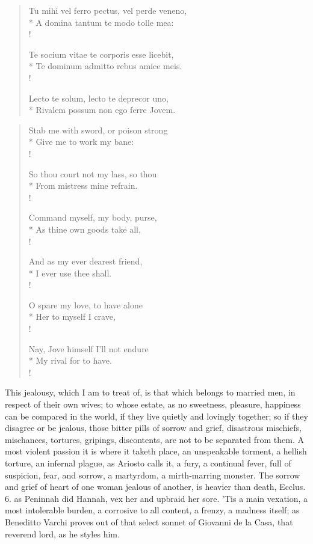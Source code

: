 {\begin{latin}
\begin{verse}
Tu mihi vel ferro pectus, vel perde veneno,\\*
A domina tantum te modo tolle mea:\\!

Te socium vitae te corporis esse licebit,\\*
Te dominum admitto rebus amice meis.\\!

Lecto te solum, lecto te deprecor uno,\\*
Rivalem possum non ego ferre Jovem.
\end{verse}
\end{latin}

\begin{verse}
Stab me with sword, or poison strong\\*
Give me to work my bane:\\!

So thou court not my lass, so thou\\*
From mistress mine refrain.\\!

Command myself, my body, purse,\\*
As thine own goods take all,\\!

And as my ever dearest friend,\\*
I ever use thee shall.\\!

O spare my love, to have alone\\*
Her to myself I crave,\\!

Nay, Jove himself I'll not endure\\*
My rival for to have.\\!
\end{verse}

This jealousy, which I am to treat of, is that which belongs to married
men, in respect of their own wives; to whose estate, as no sweetness,
pleasure, happiness can be compared in the world, if they live quietly
and lovingly together; so if they disagree or be jealous, those bitter
pills of sorrow and grief, disastrous mischiefs, mischances, tortures,
gripings, discontents, are not to be separated from them. A most
violent passion it is where it taketh place, an unspeakable torment, a
hellish torture, an infernal plague, as Ariosto calls it, a fury, a
continual fever, full of suspicion, fear, and sorrow, a martyrdom, a
mirth-marring monster. The sorrow and grief of heart of one woman
jealous of another, is heavier than death, Ecclus.  6. as
Peninnah did Hannah, vex her and upbraid her sore. 'Tis a main
vexation, a most intolerable burden, a corrosive to all content, a
frenzy, a madness itself; as Beneditto Varchi proves out of that
select sonnet of Giovanni de la Casa, that reverend lord, as he styles
him.

}
